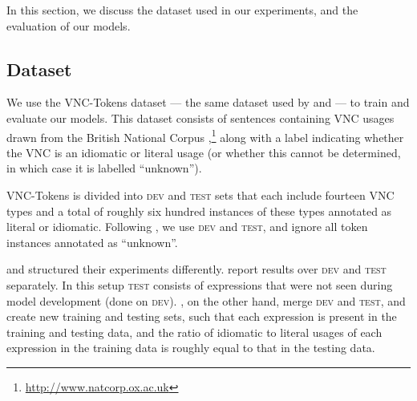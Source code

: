 \documentclass[11pt,a4paper]{article}
\newcommand{\dev}{\textsc{dev}\xspace}
\newcommand{\test}{\textsc{test}\xspace}
\begin{document}
In this section, we discuss the dataset used in our experiments, and
the evaluation of our models.

\subsection{Dataset}\label{dataset}

We use the VNC-Tokens dataset \citep{Cook2008} --- the same dataset
used by  and  --- to
train and evaluate our models. This dataset consists of sentences
containing VNC usages drawn from the British National Corpus
\citep{Burnard2000},\footnote{\url{http://www.natcorp.ox.ac.uk}} along
with a label indicating whether the VNC is an idiomatic or literal
usage (or whether this cannot be determined, in which case it is
labelled ``unknown''). 



VNC-Tokens is divided into \dev and \test sets that each include
fourteen VNC types and a total of roughly six hundred instances of
these types annotated as literal or idiomatic. Following
, we use \dev and \test, and ignore all
token instances annotated as ``unknown''.







 and  structured
their experiments differently. \citeauthor{Fazly2009} report results
over \dev and \test separately. In this setup
\test consists of expressions that were not seen during model
development (done on \dev). \citeauthor{salton-ross-kelleher},
on the other hand, merge \dev and \test, and create
new training and testing sets, such that each expression is present in
the training and testing data, and the ratio of idiomatic to literal
usages of each expression in the training data is roughly equal to
that in the testing data.
\end{document}
